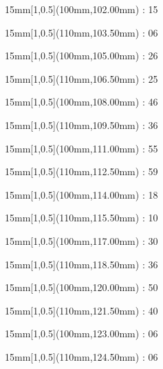 \documentclass[a4paper]{memoir}
\begin{document}
\begin{textblock*}{15mm}[1,0.5](100mm,102.00mm) : 15\end{textblock*}
\begin{textblock*}{15mm}[1,0.5](110mm,103.50mm) : 06\end{textblock*}
\begin{textblock*}{15mm}[1,0.5](100mm,105.00mm) : 26\end{textblock*}
\begin{textblock*}{15mm}[1,0.5](110mm,106.50mm) : 25\end{textblock*}
\begin{textblock*}{15mm}[1,0.5](100mm,108.00mm) : 46\end{textblock*}
\begin{textblock*}{15mm}[1,0.5](110mm,109.50mm) : 36\end{textblock*}
\begin{textblock*}{15mm}[1,0.5](100mm,111.00mm) : 55\end{textblock*}
\begin{textblock*}{15mm}[1,0.5](110mm,112.50mm) : 59\end{textblock*}
\begin{textblock*}{15mm}[1,0.5](100mm,114.00mm) : 18\end{textblock*}
\begin{textblock*}{15mm}[1,0.5](110mm,115.50mm) : 10\end{textblock*}
\begin{textblock*}{15mm}[1,0.5](100mm,117.00mm) : 30\end{textblock*}
\begin{textblock*}{15mm}[1,0.5](110mm,118.50mm) : 36\end{textblock*}
\begin{textblock*}{15mm}[1,0.5](100mm,120.00mm) : 50\end{textblock*}
\begin{textblock*}{15mm}[1,0.5](110mm,121.50mm) : 40\end{textblock*}
\begin{textblock*}{15mm}[1,0.5](100mm,123.00mm) : 06\end{textblock*}
\begin{textblock*}{15mm}[1,0.5](110mm,124.50mm) : 06\end{textblock*}
\end{document}
